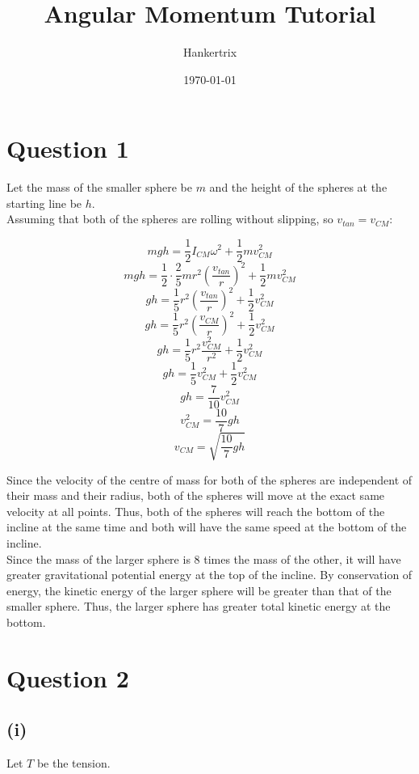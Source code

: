 \documentclass[11pt]{article}
\author{Hankertrix}
\date{\today}
\title{Angular Momentum Tutorial}
\begin{document}
\maketitle
\setcounter{tocdepth}{2}
\tableofcontents

\newpage

\section{Question 1}
\label{sec:orga499a44}

Let the mass of the smaller sphere be \(m\) and the height of the spheres at the starting line be \(h\).
\\[0pt]

Assuming that both of the spheres are rolling without slipping, so \(v_{tan} = v_{CM}\):

\[mgh = \frac{1}{2}I_{CM} \omega^2 + \frac{1}{2} m v_{CM}^2\]
\[mgh = \frac{1}{2} \cdot \frac{2}{5}mr^2 \left( \frac{v_{tan}}{r} \right)^2 + \frac{1}{2}mv_{CM}^2\]
\[gh = \frac{1}{5}r^2 \left( \frac{v_{tan}}{r} \right)^2 + \frac{1}{2}v_{CM}^2\]
\[gh = \frac{1}{5}r^2 \left( \frac{v_{CM}}{r} \right)^2 + \frac{1}{2}v_{CM}^2\]
\[gh = \frac{1}{5}r^2 \frac{v_{CM}^2}{r^2} + \frac{1}{2}v_{CM}^2\]
\[gh = \frac{1}{5} v_{CM}^2 + \frac{1}{2}v_{CM}^2\]
\[gh = \frac{7}{10} v_{CM}^2\]
\[v_{CM}^2 = \frac{10}{7} gh \]
\[v_{CM} = \sqrt{\frac{10}{7} gh}\]

Since the velocity of the centre of mass for both of the spheres are independent of their mass and their radius, both of the spheres will move at the exact same velocity at all points. Thus, both of the spheres will reach the bottom of the incline at the same time and both will have the same speed at the bottom of the incline.
\\[0pt]

Since the mass of the larger sphere is 8 times the mass of the other, it will have greater gravitational potential energy at the top of the incline. By conservation of energy, the kinetic energy of the larger sphere will be greater than that of the smaller sphere. Thus, the larger sphere has greater total kinetic energy at the bottom.


\section{Question 2}
\label{sec:org6d47500}

\subsection{(i)}
\label{sec:org10d9ece}
Let \(T\) be the tension.
\\[0pt]
\end{document}
